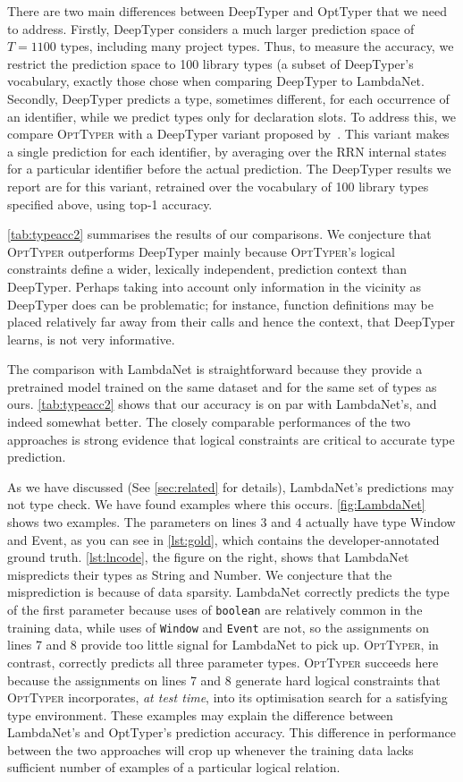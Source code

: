 \documentclass[acmsmall,nonacm]{acmart}\settopmatter{printfolios=true,printccs=false,printacmref=false}
\newcommand{\projectname}{\textsc{OptTyper}\xspace}
\begin{document}
There are two main differences between DeepTyper 
and OptTyper that we need to address. Firstly, DeepTyper considers a much larger prediction space of $T=1100$ types, including many project types. Thus, to measure the accuracy, we restrict the prediction space to 100 library types (a subset of DeepTyper's vocabulary, exactly those \citet{wei20} chose when comparing DeepTyper to LambdaNet.
Secondly, DeepTyper predicts a type, sometimes different, for each occurrence of an identifier, while we predict types only for declaration slots. To address this, we compare \projectname{} with a DeepTyper variant proposed by~\citet{wei20}.
This variant makes a single prediction for each identifier, by averaging over the RRN internal states for a particular identifier before the actual prediction.
The DeepTyper results we report are for this variant, retrained over the vocabulary of 100 library types specified above, using top-1 accuracy.

\cref{tab:typeacc2} summarises the results of our comparisons. We conjecture that \projectname outperforms DeepTyper mainly because \projectname's logical constraints define
a wider, lexically independent, prediction context than DeepTyper.
Perhaps taking into account only information in the vicinity as DeepTyper does can be problematic;
for instance, function definitions may be placed relatively far away from their calls and hence the context, that DeepTyper learns, is not very informative.

The comparison with LambdaNet is straightforward because they provide a pretrained model trained on the same dataset and for the same set of types as ours. 
\cref{tab:typeacc2} shows that our accuracy is on par with LambdaNet's, and indeed somewhat better.
The closely comparable performances of the two approaches is strong evidence that logical constraints are critical to accurate type prediction. 

As we have discussed (See \cref{sec:related} for details), 
LambdaNet's predictions may not type check.  We have found examples where this occurs. \cref{fig:LambdaNet} shows two examples.  
The parameters on lines 3 and 4 actually have type Window and Event, as you can see in \cref{lst:gold}, which contains the developer-annotated ground truth.
\cref{lst:lncode}, the figure on the right, shows that LambdaNet mispredicts their types as String and Number.
%
We conjecture that the misprediction is because of data sparsity.
%
LambdaNet correctly predicts the type of the first parameter because uses of \texttt{boolean} are relatively common in the training data, while uses of \texttt{Window} and \texttt{Event} are not, so the assignments on lines 7 and 8 provide too little signal for LambdaNet to pick up.
\projectname, in contrast, correctly predicts all three parameter types.
\projectname succeeds here because the assignments on lines 7 and 8 generate hard logical constraints that \projectname incorporates, \emph{at test time}, into its optimisation search for a satisfying type environment.
These examples may explain the difference between LambdaNet's and OptTyper's prediction accuracy. 
This difference in performance between the two approaches will crop up whenever the training data lacks sufficient number of examples of a particular logical relation.
\end{document}
